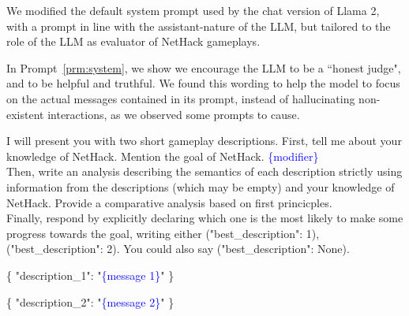 \documentclass{article} %
\begin{document}
We modified the default system prompt used by the chat version of Llama 2, with a prompt in line with the assistant-nature of the LLM, but tailored to the role of the LLM as evaluator of NetHack gameplays.

In Prompt~\ref{prm:system}, we show we encourage the LLM to be a ``honest judge", and to be helpful and truthful. We found this wording to help the model to focus on the actual messages contained in its prompt, instead of hallucinating non-existent interactions, as we observed some prompts to cause.


\begin{prompt}[h]
\centering
\begin{mymessagebox}[frametitle=Zero-knowledge prompt]
\small{}\selectfont
I will present you with two short gameplay descriptions.
First, tell me about your knowledge of NetHack. Mention the goal of NetHack. \textcolor{blue}{\{modifier\}}  \\

Then, write an analysis describing the semantics of each description strictly using information from the descriptions (which may be empty) and your knowledge of NetHack.
Provide a comparative analysis based on first princicples. \\

Finally, respond by explicitly declaring which one is the most likely to make some progress towards the goal, writing either ("best\_description": 1), ("best\_description": 2). You could also say ("best\_description": None).

\{
"description\_1":
"\textcolor{blue}{\{message 1\}}"
\}

\{
"description\_2":
"\textcolor{blue}{\{message 2\}}"
\}
    \end{mymessagebox}
    \caption{Basic \emph{zero-knowledge} prompt template, altered by changing the blue placeholders. 
    The first placeholder, \textcolor{blue}{\{modifier\}}, takes values listed in Prompt~\ref{prm:mod} depending on the experiment. 
    \textcolor{blue}{\{message 1\}} and \textcolor{blue}{\{message 2\}} are extracted from the dataset of event captions. }
    \label{prm:base}
\end{prompt}
\end{document}
